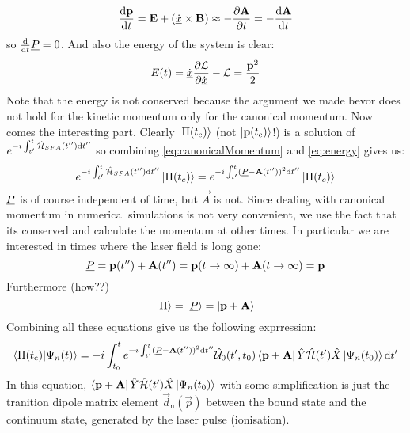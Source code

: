 \begin{equation*}
    \frac{\dd\vec{p}}{\dd t} = \vec{E} + \left(\uvec{\dot{x}}\times\vec{B}\right) \approx -\frac{\partial \vec{A}}{\partial t} = -\frac{\dd \vec{A}}{\dd t}   %
\end{equation*}
so $\frac{\mathrm{d}}{\mathrm{d} t}\underline{P}=0$.
And also the energy of the system is clear:
\begin{equation}
    E(t) = \dot{\underline{x}}\frac{\partial \mathcal{L}}{\partial \dot{\underline{x}}}-\mathcal{L} = \frac{\mathbf{p}^2}{2}     \label{eq:energy}
\end{equation}
Note that the energy is not conserved because the argument we made bevor does not hold for the kinetic momentum only for the canonical momentum.
Now comes the interesting part. Clearly $\ket{\Pi(t_{\mathrm{c}})}$ (not $\ket{\mathbf{p}(t_{\mathrm{c}})}$!) is a solution of $e^{-i \int_{t'}^{t} \hat{\mathcal{H}}_{SFA}(t'') \mathrm{d} t''}$ so combining \eqref{eq:canonicalMomentum} and \eqref{eq:energy} gives us:
\begin{equation*}
    e^{-i \int_{t'}^{t} \hat{\mathcal{H}}_{SFA}(t'') \mathrm{d} t''}\ket{\Pi(t_c)} = e^{-i \int_{t'}^{t} (\underline{P} - \mathbf{A}(t''))^2 \mathrm{d} t''}\ket{\Pi(t_c)}
\end{equation*}
$\underline{P}$ is of course independent of time, but $\vec{A}$ is not. 
Since dealing with canonical momentum in numerical simulations is not very convenient, we use the fact that its conserved and calculate the momentum at other times.
In particular we are interested in times where the laser field is long gone:
\begin{equation*}
    \underline{P} = \mathbf{p}(t'') + \mathbf{A}(t'') = \mathbf{p}(t\rightarrow \infty) + \mathbf{A}(t\rightarrow \infty) = \mathbf{p}
\end{equation*}
Furthermore (how??)
\begin{equation*}
    \ket{\Pi} = \ket{\underline{P}} = \ket{\mathbf{p}+\mathbf{A}}
\end{equation*}
Combining all these equations give us the following exprression:
\begin{equation*}
    \braket{\Pi(t_{\mathrm{c}})|\Psi_n(t)} = -i \int_{t_0}^{t} e^{-i \int_{t'}^{t} (\underline{P} - \mathbf{A}(t''))^2 \mathrm{d} t''}\hat{\mathcal{U}}_0(t',t_0)\bra{\mathbf{p}+\mathbf{A}}\hat{Y}\hat{\mathcal{H}}(t')\hat{X}\ket{\Psi_n(t_0)} \mathrm{d} t' \label{eq:smatrixlike}
\end{equation*}
In this equation, $\bra{\mathbf{p}+\mathbf{A}}\hat{Y}\hat{\mathcal{H}}(t')\hat{X}\ket{\Psi_n(t_0)}$ with some simplification is just the tranition dipole matrix element $\vec{d}_{\mathrm{n}}(\vec{p})$ between the bound state and the continuum state, generated by the laser pulse (ionisation).\\
